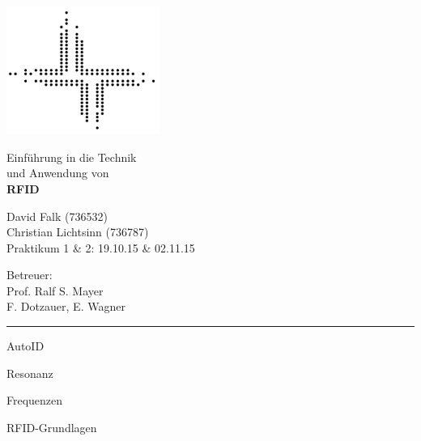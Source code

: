 \documentclass[a4paper,12pt,headsepline,footsepline]{scrartcl}
\newcommand\HRule{\noindent\rule{\linewidth}{1.5pt}}
\begin{document}
\begin{titlepage}

\begin{minipage}[c]{5cm}
\includegraphics[width=5cm]{logohdafbi-standalone}
\end{minipage}
\hfil
\begin{minipage}[c]{10cm}
\begin{flushright}
\Large Einführung in die Technik\\und Anwendung von\\
\LARGE \textbf{RFID}
\end{flushright}
\end{minipage}

\vspace*{1cm}

\begin{minipage}[c]{8cm}
\begin{flushleft}
\large David Falk (736532)\\Christian Lichtsinn (736787)\\Praktikum 1 \& 2: 19.10.15 \& 02.11.15
\end{flushleft}
\end{minipage}
\hfil
\begin{minipage}[c]{8cm}
\begin{flushright}
\large Betreuer:\\Prof. Ralf S. Mayer\\F. Dotzauer, E. Wagner
\end{flushright}
\end{minipage}

\vspace*{1cm}

\HRule


\centering
\huge

\begin{bfseries}
AutoID

Resonanz

Frequenzen

RFID-Grundlagen
\end{bfseries}


\end{titlepage}
\end{document}
